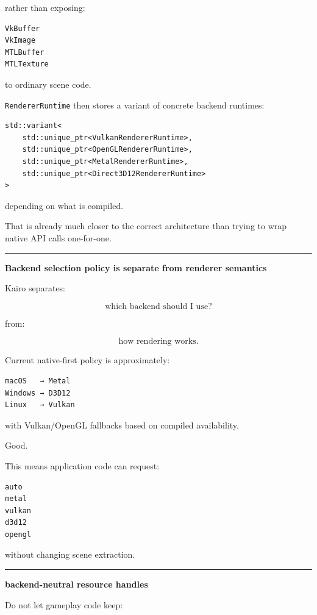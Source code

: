 rather than exposing:

\begin{verbatim}
VkBuffer
VkImage
MTLBuffer
MTLTexture
\end{verbatim}

to ordinary scene code.

\texttt{RendererRuntime} then stores a variant of concrete backend runtimes:

\begin{verbatim}
std::variant<
    std::unique_ptr<VulkanRendererRuntime>,
    std::unique_ptr<OpenGLRendererRuntime>,
    std::unique_ptr<MetalRendererRuntime>,
    std::unique_ptr<Direct3D12RendererRuntime>
>
\end{verbatim}

depending on what is compiled.

That is already much closer to the correct architecture than trying to wrap native API calls one-for-one.

\begin{center}\rule{0.5\linewidth}{0.5pt}\end{center}

\textbf{Backend selection policy is separate from renderer semantics}

Kairo separates:

\[
\text{which backend should I use?}
\]

from:

\[
\text{how rendering works}.
\]

Current native-first policy is approximately:

\begin{verbatim}
macOS   → Metal
Windows → D3D12
Linux   → Vulkan
\end{verbatim}

with Vulkan/OpenGL fallbacks based on compiled availability.

Good.

This means application code can request:

\begin{verbatim}
auto
metal
vulkan
d3d12
opengl
\end{verbatim}

without changing scene extraction.

\begin{center}\rule{0.5\linewidth}{0.5pt}\end{center}

\textbf{backend-neutral resource handles}

Do not let gameplay code keep:

